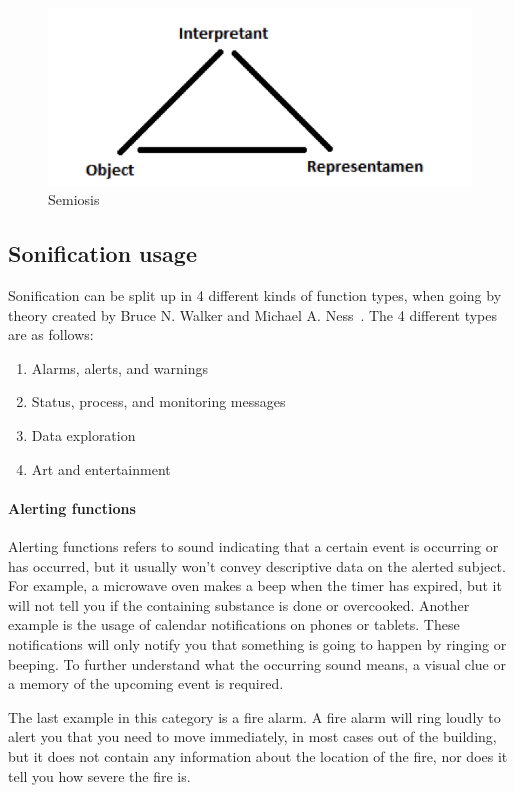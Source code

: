 \begin{figure}[!htbp]
    \centering
    \includegraphics[width=.5\textwidth]{images/Semiosis1.png}
    \caption{Semiosis}
    \label{fig:semiosis1}
\end{figure}


\FloatBarrier
\subsection{Sonification usage} %
\label{sub:sonification_usage}

Sonification can be split up in 4 different kinds of function types, when going by theory created by Bruce N. Walker and Michael A. Ness~\cite*{walker2011}. 
The 4 different types are as follows: 

\begin{enumerate}
    \item Alarms, alerts, and warnings
    \item Status, process, and monitoring messages
    \item Data exploration
    \item Art and entertainment
\end{enumerate}


\paragraph{Alerting functions} %
\label{par:alerting_functions}
Alerting functions refers to sound indicating that a certain event is occurring or has occurred, but it usually won’t convey descriptive data on the alerted subject. 
For example, a microwave oven makes a beep when the timer has expired, but it will not tell you if the containing substance is done or overcooked. 
Another example is the usage of calendar notifications on phones or tablets. 
These notifications will only notify you that something is going to happen by ringing or beeping. 
To further understand what the occurring sound means, a visual clue or a memory of the upcoming event is required.

The last example in this category is a fire alarm. 
A fire alarm will ring loudly to alert you that you need to move immediately, in most cases out of the building, but it does not contain any information about the location of the fire, nor does it tell you how severe the fire is.

